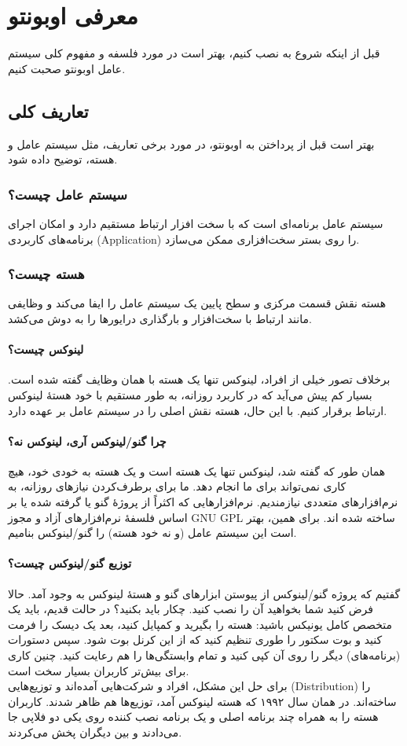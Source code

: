\chapter{معرفی اوبونتو}
قبل از اینکه شروع به نصب کنیم، بهتر است در مورد فلسفه و مفهوم کلی سیستم عامل اوبونتو صحبت کنیم.
\section{تعاریف کلی}
بهتر است قبل از پرداختن به اوبونتو، در مورد برخی تعاریف، مثل سیستم عامل و هسته، توضیح داده شود.
\subsection{سیستم عامل چیست؟}
سیستم عامل برنامه‌ای است که با سخت افزار ارتباط مستقیم دارد و امکان اجرای برنامه‌های کاربردی (Application) را روی بستر سخت‌افزاری ممکن می‌سازد.
\subsection{هسته چیست؟}
هسته نقش قسمت مرکزی و سطح پایین یک سیستم عامل را ایفا می‌کند و وظایفی مانند ارتباط با سخت‌افزار و بارگذاری درایورها را به دوش می‌کشد.
\subsubsection{لینوکس چیست؟}
برخلاف تصور خیلی از افراد، لینوکس تنها یک هسته با همان وظایف گفته شده است. بسیار کم پیش می‌آید که در کاربرد روزانه، به طور مستقیم با خود هستهٔ لینوکس ارتباط برقرار کنیم. با این حال، هسته نقش اصلی را در سیستم عامل بر عهده دارد.
\subsubsection{چرا گنو/لینوکس آری، لینوکس نه؟}
همان طور که گفته شد، لینوکس تنها یک هسته است و یک هسته به خودی خود، هیچ کاری نمی‌تواند برای ما انجام دهد. ما برای برطرف‌کردن نیازهای روزانه، به نرم‌افزارهای متعددی نیازمندیم. نرم‌افزارهایی که اکثراً از پروژهٔ گنو یا گرفته شده یا بر اساس فلسفهٔ نرم‌افزارهای آزاد و مجوز GNU GPL ساخته شده اند. برای همین، بهتر است این سیستم عامل (و نه خود هسته) را گنو/لینوکس بنامیم.
\subsubsection{توزیع گنو/لینوکس چیست؟}
گفتیم که پروژه گنو/لینوکس از پیوستن ابزارهای گنو و هستهٔ لینوکس به وجود آمد. حالا فرض کنید شما بخواهید آن را نصب کنید. چکار باید بکنید؟ در حالت قدیم، باید یک متخصص کامل یونیکس باشید: هسته را بگیرید و کمپایل کنید، بعد یک دیسک را فرمت کنید و بوت سکتور را طوری تنظیم کنید که از این کرنل بوت شود. سپس دستورات (برنامه‌های) دیگر را روی آن کپی کنید و تمام وابستگی‌ها را هم رعایت کنید. چنین کاری برای بیش‌تر کاربران بسیار سخت است.\\
برای حل این مشکل، افراد و شرکت‌هایی آمده‌اند و توزیع‌هایی (Distribution) را ساخته‌اند. در همان سال ۱۹۹۲ که هسته لینوکس آمد، توزیع‌ها هم ظاهر شدند. کاربران هسته را به همراه چند برنامه اصلی و یک برنامه نصب کننده روی یکی دو فلاپی جا می‌دادند و بین دیگران پخش می‌کردند.
